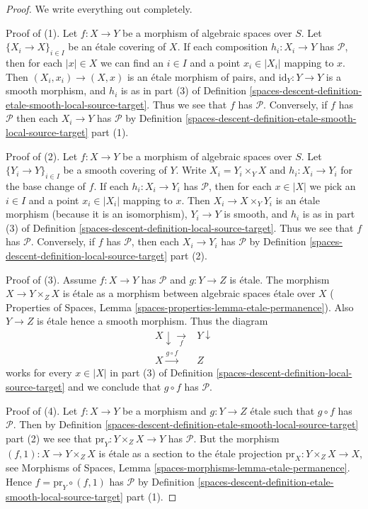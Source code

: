 \begin{proof}
We write everything out completely.

\medskip\noindent
Proof of (1). Let $f : X \to Y$ be a morphism of algebraic spaces over $S$.
Let $\{X_i \to X\}_{i \in I}$ be an \'etale covering of $X$. If each composition
$h_i : X_i \to Y$ has $\mathcal{P}$, then for each $|x| \in X$ we can find
an $i \in I$ and a point $x_i \in |X_i|$ mapping to $x$. Then
$(X_i, x_i) \to (X, x)$ is an \'etale morphism of pairs, and
$\text{id}_Y : Y \to Y$ is a smooth morphism, and $h_i$ is as in part (3) of
Definition \ref{spaces-descent-definition-etale-smooth-local-source-target}.
Thus we see that $f$ has $\mathcal{P}$.
Conversely, if $f$ has $\mathcal{P}$ then each $X_i \to Y$ has
$\mathcal{P}$ by
Definition \ref{spaces-descent-definition-etale-smooth-local-source-target} part (1).

\medskip\noindent
Proof of (2). Let $f : X \to Y$ be a morphism of algebraic spaces over $S$.
Let $\{Y_i \to Y\}_{i \in I}$ be a smooth covering of $Y$.
Write $X_i = Y_i \times_Y X$ and $h_i : X_i \to Y_i$ for the base change
of $f$. If each  $h_i : X_i \to Y_i$ has $\mathcal{P}$, then for each
$x \in |X|$ we pick an $i \in I$ and a point $x_i \in |X_i|$ mapping to $x$.
Then $X_i \to X \times_Y Y_i$ is an \'etale morphism
(because it is an isomorphism), $Y_i \to Y$ is
smooth, and $h_i$ is as in part (3) of
Definition \ref{spaces-descent-definition-local-source-target}.
Thus we see that $f$ has $\mathcal{P}$.
Conversely, if $f$ has $\mathcal{P}$, then each $X_i \to Y_i$ has
$\mathcal{P}$ by
Definition \ref{spaces-descent-definition-local-source-target} part (2).

\medskip\noindent
Proof of (3). Assume $f : X \to Y$ has $\mathcal{P}$ and $g : Y \to Z$ is
\'etale. The morphism $X \to Y \times_Z X$ is \'etale as a morphism
between algebraic spaces \'etale over $X$ (
Properties of Spaces, Lemma \ref{spaces-properties-lemma-etale-permanence}).
Also $Y \to Z$ is \'etale hence a smooth morphism.
Thus the diagram
$$
\begin{array}{cc}X \downarrow\underset{f}{\longrightarrow} & Y \downarrow \\ X \overset{g \circ f}{\longrightarrow} & Z\end{array}
$$
works for every $x \in |X|$ in part (3) of
Definition \ref{spaces-descent-definition-local-source-target}
and we conclude that $g \circ f$ has $\mathcal{P}$.

\medskip\noindent
Proof of (4). Let $f : X \to Y$ be a morphism and $g : Y \to Z$ \'etale
such that $g \circ f$ has $\mathcal{P}$. Then by
Definition \ref{spaces-descent-definition-etale-smooth-local-source-target} part (2)
we see that $\text{pr}_Y : Y \times_Z X \to Y$ has $\mathcal{P}$. But
the morphism $(f, 1) : X \to Y \times_Z X$ is \'etale as a section to the
\'etale projection $\text{pr}_X : Y \times_Z X \to X$, see
Morphisms of Spaces, Lemma \ref{spaces-morphisms-lemma-etale-permanence}.
Hence $f = \text{pr}_Y \circ (f, 1)$ has $\mathcal{P}$ by
Definition \ref{spaces-descent-definition-etale-smooth-local-source-target} part (1).
\end{proof}

